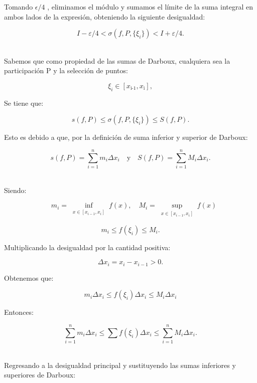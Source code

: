 \documentclass[a4paper,12pt]{article}
\begin{document}
	Tomando $\epsilon/4$ , eliminamos el módulo y sumamos el límite de la suma integral en ambos lados de la expresión, obteniendo la siguiente desigualdad:
	
	
	
	\[
	I - \varepsilon/4 < \sigma(f, P, \{\xi_i\}) < I + \varepsilon/4.
	\]
	
	\quad \\
	
	Sabemos que como propiedad de las sumas de Darboux, cualquiera sea la participación P y la selección de puntos:
	
	
	
	\[
	\xi_i \in [x_{\text{i-1}},x_{\text{i}}],
	\]
	
	
	
	Se tiene que:
	
	
	
	\[
	s(f, P) \leq \sigma(f, P, \{\xi_i\}) \leq S(f, P).
	\]
	
	
	
	Esto es debido a que, por la definición de suma inferior y superior de Darboux:
	
	
	
	\[
	s(f, P) = \sum_{i=1}^{n} m_i \Delta x_i \quad \text{y} \quad S(f,P) = \sum_{i=1}^{n} M_i \Delta x_i.
	\]
	
	\quad \\
	
	Siendo: 
	
	\[
	\quad m_i = \inf_{\substack{x \in [x_{i-1}, x_i]}} f(x), \quad
	M_i = \sup_{\substack{x \in [x_{i-1}, x_i]}} f(x)
	\]
	
	
	
	\[
	m_i \leq f(\xi_i) \leq M_i.
	\]
	
	
	

	Multiplicando la desigualdad por la cantidad positiva:
	
	
	\[
\Delta x_i = x_i - x_{i-1} > 0.
	\]
	
	
	
	Obtenemos que:
	
	\[
	m_i \Delta x_i \leq f(\xi_i) \Delta x_i \leq M_i \Delta x_i
	\]
	
	Entonces:
	
	
	\[
	\sum_{i=1}^{n} m_i \Delta x_i \leq \sum f(\xi_i) \Delta x_i \leq \sum_{i=1}^{n} M_i \Delta x_i.
	\]
	
	\quad \\
	
	Regresando a la desigualdad principal y sustituyendo las sumas inferiores y superiores de Darboux:
	
\end{document}
